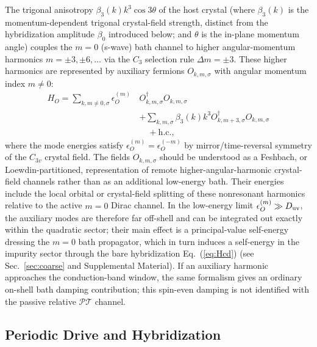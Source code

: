 \documentclass[%
  aps,prb,reprint,amsmath,amssymb,superscriptaddress,longbibliography,floatfix
]{revtex4-2}
\newcommand{\PT}{\mathcal{PT}}
\newcommand{\gb}{\beta_0}               %
\begin{document}
The trigonal anisotropy $\beta_3(k)k^3\cos3\theta$ of the host crystal
(where $\beta_3(k)$ is the momentum-dependent trigonal crystal-field strength,
distinct from the hybridization amplitude $\gb$ introduced below;
and $\theta$ is the in-plane momentum angle) couples the
$m=0$ (s-wave) bath channel to higher angular-momentum harmonics
$m=\pm3,\pm6,\ldots$ via the $C_3$ selection rule $\Delta m=\pm3$.
These higher harmonics are represented by auxiliary fermions
$O_{k,m,\sigma}$ with angular momentum index $m\neq0$:
\begin{equation}
\begin{split}
    H_O=\sum_{k,m\neq0,\sigma}
\epsilon_O^{(m)}\,&O^\dagger_{k,m,\sigma}O_{k,m,\sigma}\\
&+\sum_{k,m,\sigma}\beta_3(k)k^3
O^\dagger_{k,m+3,\sigma}O_{k,m,\sigma}\\
&\quad+\mathrm{h.c.},
\label{eq:HO}
\end{split}
\end{equation}
where the mode energies satisfy $\epsilon_O^{(m)}=\epsilon_O^{(-m)}$
by mirror/time-reversal symmetry of the $C_{3v}$ crystal field.  The fields $O_{k,m,\sigma}$
should be understood as a Feshbach, or Loewdin-partitioned, representation
of remote higher-angular-harmonic crystal-field channels rather than as
an additional low-energy bath.  Their energies include the local orbital
or crystal-field splitting of these nonresonant harmonics relative to
the active $m=0$ Dirac channel.  In the low-energy limit
$\epsilon_O^{(m)}\gg D_{\rm uv}$, the auxiliary modes are therefore far off-shell
and can be integrated out exactly within the quadratic sector; their
main effect is a principal-value self-energy dressing the $m=0$ bath
propagator, which in turn induces a self-energy in the impurity sector
through the bare hybridization Eq.~(\ref{eq:Hcd})
(see Sec.~\ref{sec:coarse} and Supplemental Material).  If an
auxiliary harmonic approaches the conduction-band window, the same
formalism gives an ordinary on-shell bath damping contribution; this
spin-even damping is not identified with the passive relative $\PT$ channel.


\subsection{Periodic Drive and Hybridization}
\end{document}
